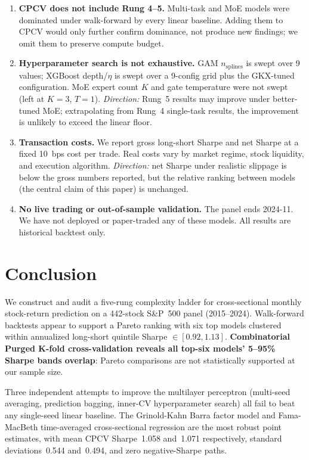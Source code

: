 \documentclass[11pt]{article}
\begin{document}
\begin{enumerate}[leftmargin=2em,topsep=2pt,itemsep=4pt]
\item \textbf{CPCV does not include Rung 4--5.} Multi-task and MoE
  models were dominated under walk-forward by every linear baseline.
  Adding them to CPCV would only further confirm dominance, not
  produce new findings; we omit them to preserve compute budget.

\item \textbf{Hyperparameter search is not exhaustive.} GAM
  $n_{\text{splines}}$ is swept over 9 values; XGBoost depth/$\eta$
  is swept over a 9-config grid plus the GKX-tuned configuration. MoE
  expert count $K$ and gate temperature were not swept (left at
  $K{=}3$, $T{=}1$). \emph{Direction:} Rung~5 results may improve under
  better-tuned MoE; extrapolating from Rung~4 single-task results, the
  improvement is unlikely to exceed the linear floor.

\item \textbf{Transaction costs.} We report gross long-short Sharpe
  and net Sharpe at a fixed 10~bps cost per trade. Real costs vary by
  market regime, stock liquidity, and execution algorithm. \emph{Direction:}
  net Sharpe under realistic slippage is below the gross numbers
  reported, but the relative ranking between models (the central claim
  of this paper) is unchanged.

\item \textbf{No live trading or out-of-sample validation.} The panel
  ends 2024-11. We have not deployed or paper-traded any of these
  models. All results are historical backtest only.

\end{enumerate}

\section{Conclusion}\label{sec:conclusion}

We construct and audit a five-rung complexity ladder for cross-sectional
monthly stock-return prediction on a 442-stock S\&P~500 panel
(2015--2024). Walk-forward backtests appear to support a Pareto
ranking with six top models clustered within annualized long-short
quintile Sharpe $\in[0.92, 1.13]$. \textbf{Combinatorial Purged K-fold
cross-validation reveals all top-six models' 5--95\% Sharpe bands
overlap}: Pareto comparisons are not statistically supported at our
sample size.

Three independent attempts to improve the multilayer perceptron
(multi-seed averaging, prediction bagging, inner-CV hyperparameter
search) all fail to beat any single-seed linear baseline. The
Grinold-Kahn Barra factor model and Fama-MacBeth time-averaged
cross-sectional regression are the most robust point estimates, with
mean CPCV Sharpe~1.058 and~1.071 respectively, standard
deviations~0.544 and~0.494, and zero negative-Sharpe paths.
\end{document}
